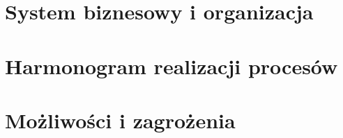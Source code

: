\documentclass[12pt]{article}
\begin{document}


\section{System biznesowy i organizacja}




\section{Harmonogram realizacji procesów}


\section{Możliwości i zagrożenia}
\end{document}
